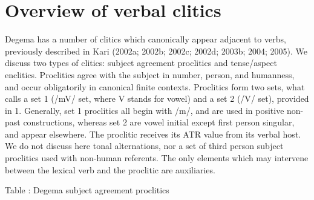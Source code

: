 \documentclass[output=paper]{langsci/langscibook}
\begin{document}
\section{Overview of verbal clitics}

Degema has a number of clitics which canonically appear adjacent to verbs, previously described in Kari (2002a; 2002b; 2002c; 2002d; 2003b; 2004; 2005). We discuss two types of clitics: subject agreement proclitics and tense/aspect enclitics. Proclitics agree with the subject in number, person, and humanness, and occur obligatorily in canonical finite contexts. Proclitics form two sets, what \citet[333-335]{Kari2004} calls a set 1 (/mV/ set, where V stands for vowel) and a set 2 (/V/ set), provided in 1. Generally, set 1 proclitics all begin with /m/, and are used in positive non-past constructions, whereas set 2 are vowel initial except first person singular, and appear elsewhere. The proclitic receives its ATR value from its verbal host. We do not discuss here tonal alternations, nor a set of third person subject proclitics used with non-human referents. The only elements which may intervene between the lexical verb and the proclitic are auxiliaries.

\begin{stylelsTableHeading}
\label{bkm:Ref447870844}Table : Degema subject agreement proclitics
\end{stylelsTableHeading}
\end{document}
